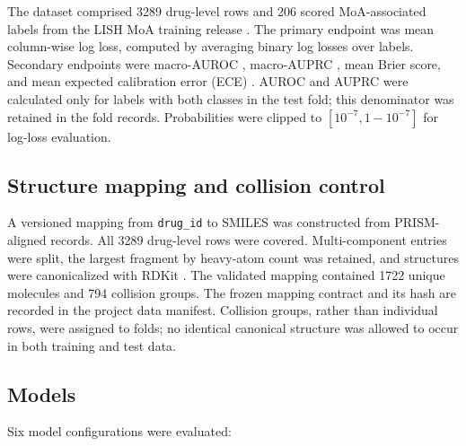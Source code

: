 \documentclass[11pt,a4paper]{article}
\begin{document}
The dataset comprised \num{3289} drug-level rows and \num{206} scored MoA-associated labels from the LISH MoA training release \citep{lish_moa_2019}. The primary endpoint was mean column-wise log loss, computed by averaging binary log losses over labels. Secondary endpoints were macro-AUROC \citep{bmj2006rocauc}, macro-AUPRC \citep{davis2006auprc}, mean Brier score, and mean expected calibration error (ECE) \citep{natoesci2017ece}. AUROC and AUPRC were calculated only for labels with both classes in the test fold; this denominator was retained in the fold records. Probabilities were clipped to $[10^{-7},1-10^{-7}]$ for log-loss evaluation.

\subsection{Structure mapping and collision control}

A versioned mapping from \texttt{drug\_id} to SMILES was constructed from PRISM-aligned records. All \num{3289} drug-level rows were covered. Multi-component entries were split, the largest fragment by heavy-atom count was retained, and structures were canonicalized with RDKit \citep{RDKit}. The validated mapping contained \num{1722} unique molecules and \num{794} collision groups. The frozen mapping contract and its hash are recorded in the project data manifest. Collision groups, rather than individual rows, were assigned to folds; no identical canonical structure was allowed to occur in both training and test data.

\subsection{Models}

Six model configurations were evaluated:
\end{document}
